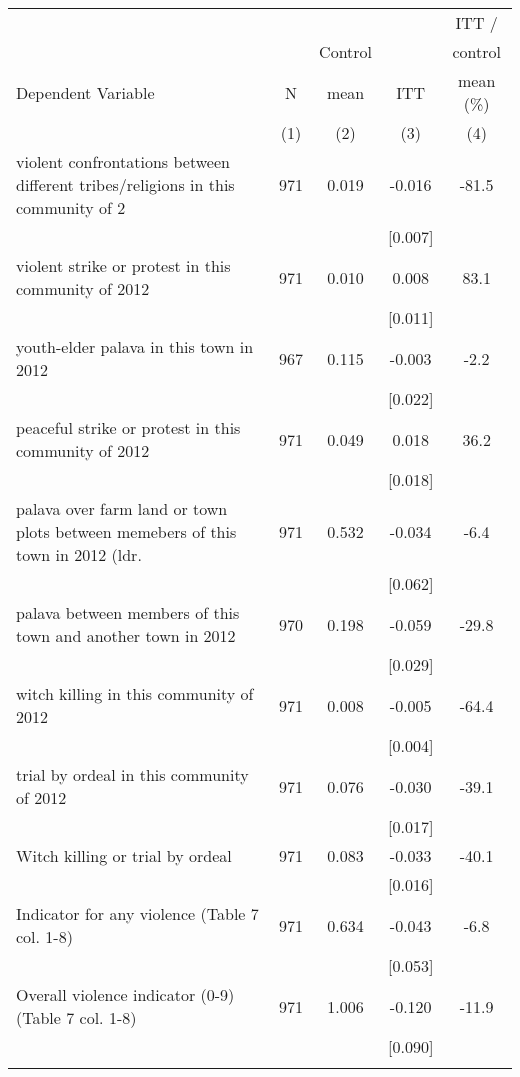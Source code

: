 \begin{tabular}{lcccc}
\hline \noalign{\smallskip} &  &  &  & ITT /\\
 &  & Control &  & control\\
Dependent Variable & N & mean & ITT & mean (\%)\\
 & (1) & (2) & (3) & (4)\\
\noalign{\smallskip}\hline \noalign{\smallskip}violent confrontations between different tribes/religions in this community of 2 & 971 & 0.019 & -0.016 & -81.5\\
 &  &  & [0.007] & \\
violent strike or protest in this community of 2012 & 971 & 0.010 & 0.008 & 83.1\\
 &  &  & [0.011] & \\
youth-elder palava in this town in 2012 & 967 & 0.115 & -0.003 & -2.2\\
 &  &  & [0.022] & \\
peaceful strike or protest in this community of 2012 & 971 & 0.049 & 0.018 & 36.2\\
 &  &  & [0.018] & \\
palava over farm land or town plots between memebers of this town in 2012 (ldr.  & 971 & 0.532 & -0.034 & -6.4\\
 &  &  & [0.062] & \\
palava between members of this town and another town in 2012 & 970 & 0.198 & -0.059 & -29.8\\
 &  &  & [0.029] & \\
witch killing in this community of 2012 & 971 & 0.008 & -0.005 & -64.4\\
 &  &  & [0.004] & \\
trial by ordeal in this community of 2012 & 971 & 0.076 & -0.030 & -39.1\\
 &  &  & [0.017] & \\
Witch killing or trial by ordeal & 971 & 0.083 & -0.033 & -40.1\\
 &  &  & [0.016] & \\
Indicator for any violence (Table 7 col. 1-8) & 971 & 0.634 & -0.043 & -6.8\\
 &  &  & [0.053] & \\
Overall violence indicator (0-9) (Table 7 col. 1-8) & 971 & 1.006 & -0.120 & -11.9\\
 &  &  & [0.090] & \\
\noalign{\smallskip}\hline\end{tabular}
